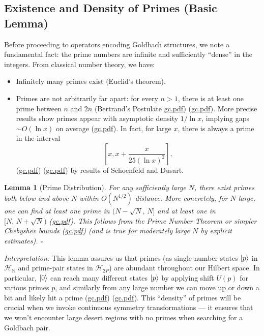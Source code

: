 \documentclass[12pt]{article}
\newtheorem{lemma}{Lemma}
\begin{document}
\subsection{Existence and Density of Primes (Basic Lemma)}
Before proceeding to operators encoding Goldbach structures, we note a fundamental fact: the prime numbers are infinite and sufficiently ``dense'' in the integers. From classical number theory, we have:
\begin{itemize}[leftmargin=*,label={--}]
  \item Infinitely many primes exist (Euclid’s theorem).
  \item Primes are not arbitrarily far apart: for every $n>1$, there is at least one prime between $n$ and $2n$ (Bertrand’s Postulate \href{file://file-7ZYYwSHWVa83XEVTrEhg5z#:~:text=%24,Further%20improvements%20by}{gc.pdf}) (\href{file://file-7ZYYwSHWVa83XEVTrEhg5z#:~:text=example%2C%20Bertrand%E2%80%99s%20Postulate%20ensures%20for,x%2C%20x)}{gc.pdf}). More precise results show primes appear with asymptotic density $1/\ln x$, implying gaps $\sim O(\ln x)$ on average (\href{file://file-7ZYYwSHWVa83XEVTrEhg5z#:~:text=from%20analytic%20number%20theory,Wikipedia}{gc.pdf}). In fact, for large $x$, there is always a prime in the interval 
\[
[x, x + \frac{x}{25(\ln x)^2}],
\]
(\href{file://file-7ZYYwSHWVa83XEVTrEhg5z#:~:text=results%20show%20primes%20much%20closer%3A,prime%20%E2%80%9Cnearby%E2%80%9D%20%E2%80%93%20quantitatively%2C%20the}{gc.pdf}) (\href{file://file-7ZYYwSHWVa83XEVTrEhg5z#:~:text=lies%20in%20%24%28n%2C%201,Such%20results%20ground}{gc.pdf}) by results of Schoenfeld and Dusart.
\end{itemize}

\begin{lemma}[Prime Distribution]
\textit{For any sufficiently large $N$, there exist primes both below and above $N$ within $O(N^{1/2})$ distance.} More concretely, for $N$ large, one can find at least one prime in $(N-\sqrt{N},\,N]$ and at least one in $[N,\,N+\sqrt{N})$ (\href{file://file-7ZYYwSHWVa83XEVTrEhg5z#:~:text=number,the%20Prime%20Number%20Theorem%20or}{gc.pdf}). This follows from the Prime Number Theorem or simpler Chebyshev bounds (\href{file://file-7ZYYwSHWVa83XEVTrEhg5z#:~:text=infinity,pi%28x)}{gc.pdf}) (and is true for moderately large $N$ by explicit estimates). \hfill $\square$
\end{lemma}

\textit{Interpretation:} This lemma assures us that primes (as single-number states $\ket{p}$ in $\mathcal{H}_{\mathbb{N}}$ and prime-pair states in $\mathcal{H}_{2P}$) are abundant throughout our Hilbert space. In particular, $\ket{0}$ can reach many different states $\ket{p}$ by applying shift $U(p)$ for various primes $p$, and similarly from any large number we can move up or down a bit and likely hit a prime (\href{file://file-7ZYYwSHWVa83XEVTrEhg5z#:~:text=number,the%20Prime%20Number%20Theorem%20or}{gc.pdf}) (\href{file://file-7ZYYwSHWVa83XEVTrEhg5z#:~:text=Chebyshev,For%20rigor%20from%20first}{gc.pdf}). This ``density'' of primes will be crucial when we invoke continuous symmetry transformations --- it ensures that we won’t encounter large desert regions with no primes when searching for a Goldbach pair.
\end{document}
